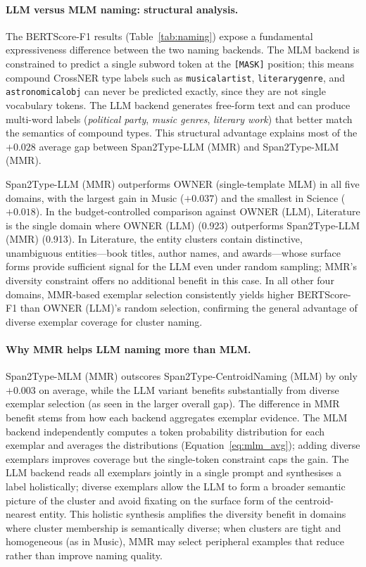 \documentclass[14pt]{extreport}
\begin{document}
\paragraph{LLM versus MLM naming: structural analysis.}
The BERTScore-F1 results (Table~\ref{tab:naming}) expose a fundamental expressiveness difference between the two naming backends. The MLM backend is constrained to predict a single subword token at the \texttt{[MASK]} position; this means compound CrossNER type labels such as \texttt{musicalartist}, \texttt{literarygenre}, and \texttt{astronomicalobj} can never be predicted exactly, since they are not single vocabulary tokens. The LLM backend generates free-form text and can produce multi-word labels (\textit{political party}, \textit{music genres}, \textit{literary work}) that better match the semantics of compound types. This structural advantage explains most of the $+0.028$ average gap between Span2Type-LLM (MMR) and Span2Type-MLM (MMR).

Span2Type-LLM (MMR) outperforms OWNER (single-template MLM) in all five domains, with the largest gain in Music ($+0.037$) and the smallest in Science ($+0.018$).
In the budget-controlled comparison against OWNER (LLM), Literature is the single domain where OWNER (LLM) (0.923) outperforms Span2Type-LLM (MMR) (0.913).
In Literature, the entity clusters contain distinctive, unambiguous entities---book titles, author names, and awards---whose surface forms provide sufficient signal for the LLM even under random sampling; MMR's diversity constraint offers no additional benefit in this case.
In all other four domains, MMR-based exemplar selection consistently yields higher BERTScore-F1 than OWNER (LLM)'s random selection, confirming the general advantage of diverse exemplar coverage for cluster naming.

\paragraph{Why MMR helps LLM naming more than MLM.}
Span2Type-MLM (MMR) outscores Span2Type-CentroidNaming (MLM) by only $+0.003$ on average, while the LLM variant benefits substantially from diverse exemplar selection (as seen in the larger overall gap). The difference in MMR benefit stems from how each backend aggregates exemplar evidence. The MLM backend independently computes a token probability distribution for each exemplar and averages the distributions (Equation~\ref{eq:mlm_avg}); adding diverse exemplars improves coverage but the single-token constraint caps the gain. The LLM backend reads all exemplars jointly in a single prompt and synthesises a label holistically; diverse exemplars allow the LLM to form a broader semantic picture of the cluster and avoid fixating on the surface form of the centroid-nearest entity. This holistic synthesis amplifies the diversity benefit in domains where cluster membership is semantically diverse; when clusters are tight and homogeneous (as in Music), MMR may select peripheral examples that reduce rather than improve naming quality.
\end{document}

